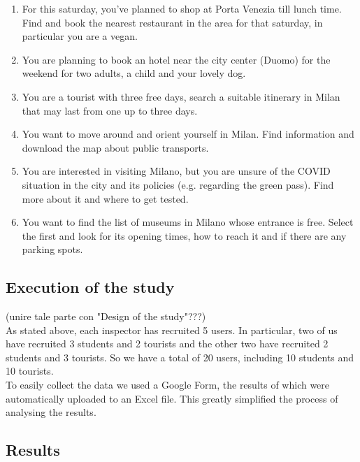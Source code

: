     \begin{enumerate}
        \item For this saturday, you've planned to shop at Porta Venezia till lunch time. Find and book the nearest restaurant in the area for that saturday, in particular you are a vegan.
        \item You are planning to book an hotel near the city center (Duomo) for the weekend for two adults, a child and your lovely dog.
        \item You are a tourist with three free days, search a suitable itinerary in Milan that may last from one up to three days.
        \item You want to move around and orient yourself in Milan. Find information and download the map about public transports.
        \item You are interested in visiting Milano, but you are unsure of the COVID situation in the city and its policies (e.g. regarding the green pass). Find more about it and where to get tested.
        \item You want to find the list of museums in Milano whose entrance is free. Select the first and look for its opening times, how to reach it and if there are any parking spots.
    \end{enumerate}
    
\subsection{Execution of the study}
    (unire tale parte con "Design of the study"???)\\
    As stated above, each inspector has recruited 5 users. In particular, two of us have recruited 3 students and 2 tourists and the other two have recruited 2 students and 3 tourists. So we have a total of 20 users, including 10 students and 10 tourists.\\
    To easily collect the data we used a Google Form, the results of which were automatically uploaded to an Excel file. This greatly simplified the process of analysing the results.

\subsection{Results}

